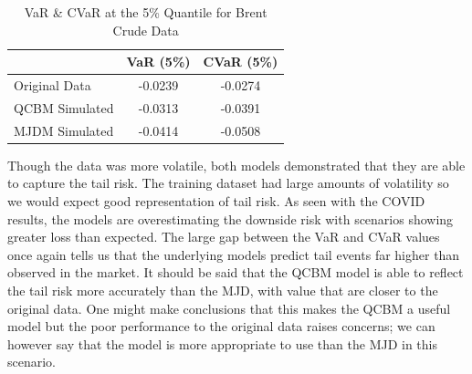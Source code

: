 \documentclass[12pt]{article}
\numberwithin{equation}{section}
\begin{document}
\begin{table}[h!]
\centering
\begin{tabular}{lcc}
\hline
\textbf{} & \textbf{VaR (5\%)} & \textbf{CVaR (5\%)} \\
\hline
Original Data     & -0.0239 & -0.0274 \\
QCBM Simulated    & -0.0313 & -0.0391 \\
MJDM Simulated    & -0.0414 & -0.0508 \\
\hline
\end{tabular}
\caption{VaR \& CVaR at the 5\% Quantile for Brent Crude Data}
\label{tab:cvar_5_brent}
\end{table}
Though the data was more volatile, both models demonstrated that they 
are able to capture the tail risk. The training dataset had large amounts of 
volatility so we would expect good representation of tail risk. 
As seen with the COVID results, 
the models are overestimating the downside risk with scenarios showing 
greater loss than expected. The large gap between the VaR and CVaR values once 
again tells us that the underlying models predict tail events far higher than 
observed in the market. It should be said that the QCBM model is able to reflect 
the tail risk more accurately than the MJD, with value that are closer to the 
original data. One might make conclusions that this makes the QCBM a useful model 
but the poor performance to the original data raises concerns; we can however 
say that the model is more appropriate to use than the MJD in this scenario. 
\end{document}
